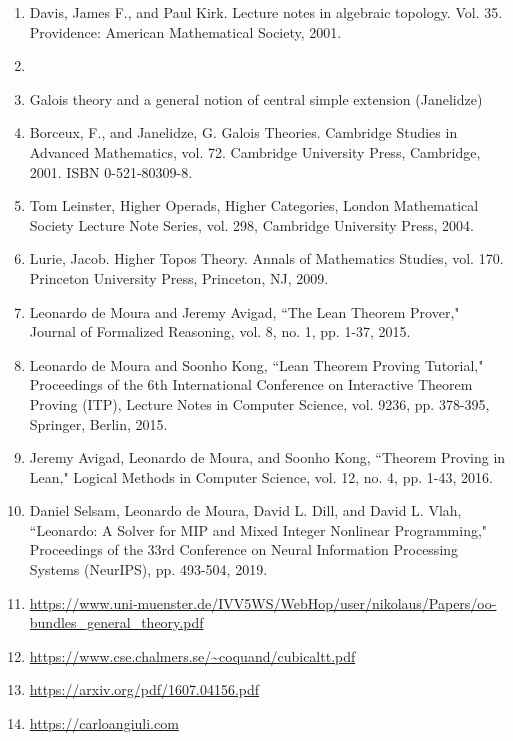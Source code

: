 \documentclass{book}
\theoremstyle{definition}
\begin{document}

\begin{enumerate}
\item Davis, James F., and Paul Kirk. Lecture notes in algebraic topology. Vol. 35. Providence: American Mathematical Society, 2001.
\item 
\item Galois theory and a general notion of central simple extension (Janelidze) 
\item Borceux, F., and Janelidze, G. Galois Theories. Cambridge Studies in Advanced Mathematics, vol. 72. Cambridge University Press, Cambridge, 2001. ISBN 0-521-80309-8.
\item Tom Leinster, Higher Operads, Higher Categories, London Mathematical Society Lecture Note Series, vol. 298, Cambridge University Press, 2004.
\item Lurie, Jacob. Higher Topos Theory. Annals of Mathematics Studies, vol. 170. Princeton University Press, Princeton, NJ, 2009.
\item Leonardo de Moura and Jeremy Avigad, ``The Lean Theorem Prover," Journal of Formalized Reasoning, vol. 8, no. 1, pp. 1-37, 2015.
\item Leonardo de Moura and Soonho Kong, ``Lean Theorem Proving Tutorial," Proceedings of the 6th International Conference on Interactive Theorem Proving (ITP), Lecture Notes in Computer Science, vol. 9236, pp. 378-395, Springer, Berlin, 2015.
\item Jeremy Avigad, Leonardo de Moura, and Soonho Kong, ``Theorem Proving in Lean," Logical Methods in Computer Science, vol. 12, no. 4, pp. 1-43, 2016.
\item Daniel Selsam, Leonardo de Moura, David L. Dill, and David L. Vlah, ``Leonardo: A Solver for MIP and Mixed Integer Nonlinear Programming," Proceedings of the 33rd Conference on Neural Information Processing Systems (NeurIPS), pp. 493-504, 2019.
\item \url{https://www.uni-muenster.de/IVV5WS/WebHop/user/nikolaus/Papers/oo-bundles_general_theory.pdf}
\item \url{https://www.cse.chalmers.se/~coquand/cubicaltt.pdf}
\item \url{https://arxiv.org/pdf/1607.04156.pdf}
\item \url{https://carloangiuli.com}
\end{enumerate}
\end{document}
